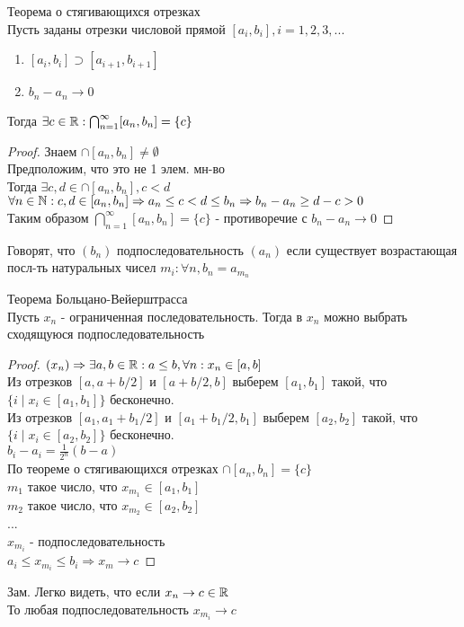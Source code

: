 
\begin{theorem}
	Теорема о стягивающихся отрезках \\
	Пусть заданы отрезки числовой прямой $ [a_i, b_i], i = 1, 2, 3,...$ 
	\begin{enumerate}
		\item $ [a_i, b_i] \supset [a_{i+1}, b_{i+1}] $ 
		\item $ b_n - a_n \rightarrow 0 $ 
	\end{enumerate}
	Тогда $ \exists c \in \mathbb{R} : \bigcap_{n=1}^{\infty} [a_n, b_n] = \{ c \} $
	\begin{proof}
		Знаем $ \cap [a_n, b_n] \neq \emptyset $ \\
		Предположим, что это не 1 элем. мн-во \\
		Тогда $ \exists c, d \in  \cap [a_n, b_n], c < d $ \\
		$ \forall n \in \mathbb{N} : c, d \in [a_n, b_n ] \Rightarrow a_n \leq c < d \leq b_n \Rightarrow b_n - a_n \geq d -c > 0$ \\
		Таким образом $ \bigcap_{n=1}^{\infty} [a_n, b_n] = \{ c \} $ - противоречие с $ b_n - a_n \rightarrow 0 $	
	\end{proof}
\end{theorem}
\begin{definition}
	Говорят, что $ (b_n) $ подпоследовательность $ (a_n) $ если существует возрастающая посл-ть натуральных чисел $ m_i : \forall n, b_n = a_{m_n}$ 
\end{definition}
\begin{theorem}
	Теорема Больцано-Вейерштрасса \\

	Пусть $ x_n$ - ограниченная последовательность. Тогда в $ x_n $ можно выбрать сходящуюся подпоследовательность
	\begin{proof}
	$ (x_n) \Rightarrow \exists a, b \in \mathbb{R} : a \leq b, \forall n : x_n \in [a, b] $ \\
	Из отрезков $ [a, a+b / 2] $ и $ [a+b/2, b] $ выберем $ [a_1, b_1] $ такой, что $ \{i \mid x_i \in [a_1, b_1]\} $ бесконечно. \\
 	Из отрезков $ [a_1, a_1+b_1 / 2] $ и $ [a_1+b_1/2, b_1] $ выберем $ [a_2, b_2] $ такой, что $ \{i \mid x_i \in [a_2, b_2]\} $ бесконечно. \\
    $ b_i - a_i = \frac{1}{2^n} (b-a) $ \\
    По теореме о стягивающихся отрезках 
    $ \cap [a_n, b_n] = \{c\}$ \\
    $ m_1 $ такое число, что $ x_{m_1} \in [a_1, b_1] $ \\
    $ m_2 $ такое число, что $ x_{m_2} \in [a_2, b_2] $ \\
    ...\\
    $ x_{m_i} $ - подпоследовательность \\
    $ a_i \leq x_{m_i} \leq b_i  \Rightarrow x_m \rightarrow c$ 
    \end{proof}
	Зам. Легко видеть, что  если $ x_n \rightarrow c \in \mathbb{R} $ \\
	То любая подпоследовательность $ x_{m_i} \rightarrow c $ \\
\end{theorem}
